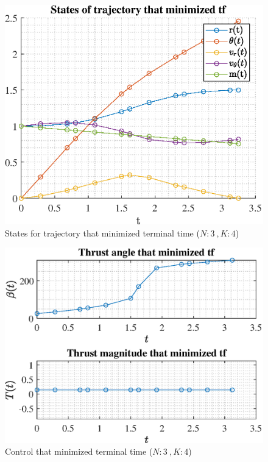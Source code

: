 \documentclass[]{article}
\begin{document}
	\begin{figure}
		\centering
		\includegraphics[scale=0.75]{states_N3_K4_C3_tf.eps}
		\caption{States for trajectory that minimized terminal time (\(N:3\ , K:4\))}
		\label{fig:states_N3_K4_C3_tf}
	\end{figure}
	\begin{figure}
		\centering
		\includegraphics[scale=0.75]{control_N3_K4_C3_tf.eps}
		\caption{Control that minimized terminal time (\(N:3\ , K:4\))}
		\label{fig:control_N3_K4_C3_tf}
	\end{figure}
\end{document}

